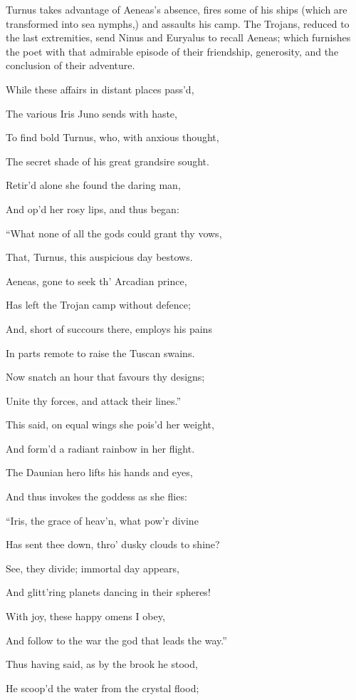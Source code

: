 Turnus takes advantage of Aeneas’s absence, fires some of his ships
(which are transformed into sea nymphs,) and assaults his camp. The Trojans,
reduced to the last extremities, send Ninus and Euryalus to recall Aeneas;
which furnishes the poet with that admirable episode of their friendship,
generosity, and the conclusion of their adventure.

While these affairs in distant places pass’d,

The various Iris Juno sends with haste,

To find bold Turnus, who, with anxious thought,

The secret shade of his great grandsire sought.

Retir’d alone she found the daring man,

And op’d her rosy lips, and thus began:

“What none of all the gods could grant thy vows,

That, Turnus, this auspicious day bestows.

Aeneas, gone to seek th’ Arcadian prince,

Has left the Trojan camp without defence;

And, short of succours there, employs his pains

In parts remote to raise the Tuscan swains.

Now snatch an hour that favours thy designs;

Unite thy forces, and attack their lines.”

This said, on equal wings she pois’d her weight,

And form’d a radiant rainbow in her flight.

The Daunian hero lifts his hands and eyes,

And thus invokes the goddess as she flies:

“Iris, the grace of heav’n, what pow’r divine

Has sent thee down, thro’ dusky clouds to shine?

See, they divide; immortal day appears,

And glitt’ring planets dancing in their spheres!

With joy, these happy omens I obey,

And follow to the war the god that leads the way.”

Thus having said, as by the brook he stood,

He scoop’d the water from the crystal flood;


